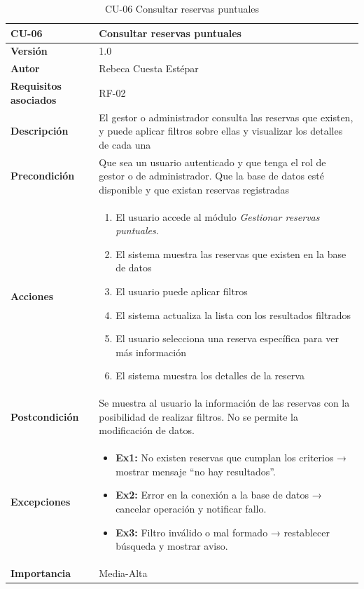 \begin{table}[p]
	\centering
	\begin{tabularx}{\linewidth}{ p{} p{} }
		\toprule
		\textbf{CU-06}    & \textbf{Consultar reservas puntuales}\\
		\toprule
		\textbf{Versión}              & 1.0    \\
		\textbf{Autor}                & Rebeca Cuesta Estépar \\
		\textbf{Requisitos asociados} & RF-02 \\
		\textbf{Descripción}          & El gestor o administrador consulta las reservas que existen, y puede aplicar filtros sobre ellas y visualizar los detalles de cada una \\
		\textbf{Precondición}         & Que sea un usuario autenticado y que tenga el rol de gestor o de administrador. Que la base de datos esté disponible y que existan reservas registradas \\
		\textbf{Acciones}             &
		\begin{enumerate}
			\def\labelenumi{\arabic{enumi}.}
			\tightlist
			\item El usuario accede al módulo \emph{Gestionar reservas puntuales}.
			\item El sistema muestra las reservas que existen en la base de datos
			\item El usuario puede aplicar filtros
			\item El sistema actualiza la lista con los resultados filtrados
			\item El usuario selecciona una reserva específica para ver más información
			\item El sistema muestra los detalles de la reserva
		\end{enumerate}\\
		\textbf{Postcondición}        &  Se muestra al usuario la información de las reservas con la posibilidad de realizar filtros. No se permite la modificación de datos.\\
		\textbf{Excepciones}          &  
		\begin{itemize}[itemsep=0.15em, parsep=0pt, topsep=0pt, leftmargin=*]
			\item \textbf{Ex1:} No existen reservas que cumplan los criterios → mostrar mensaje “no hay resultados”.
			\item \textbf{Ex2:} Error en la conexión a la base de datos → cancelar operación y notificar fallo.
			\item \textbf{Ex3:} Filtro inválido o mal formado → restablecer búsqueda y mostrar aviso.
		\end{itemize}\\
		\textbf{Importancia}          & Media-Alta \\
		\bottomrule
	\end{tabularx}
	\caption{CU-06 Consultar reservas puntuales}
\end{table}


